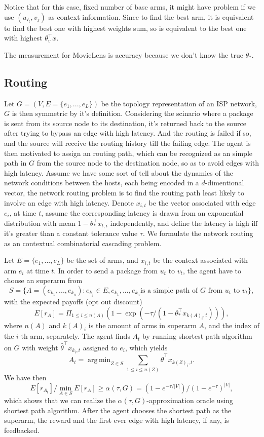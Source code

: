 \documentclass[a4paper,11pt]{article}
\DeclareMathOperator*{\argmin}{arg\,min}
\begin{document}
Notice that for this case, fixed number of base arms, it might have problem if we use $(u_{I_t}, v_j)$ as context information.
Since to find the best arm, it is equivalent to find the best one with highest weights sum, so is equivalent to the best one with highest $\theta_{v}^{\top}x$.

The measurement for MovieLens is accuracy because we don't know the true $\theta_{\ast}$.

\subsection{Routing}

Let $G=(V,E=\{e_1,...,e_L\})$ be the topology representation of an ISP network, $G$ is then symmetric by it's definition. 
Considering the scinario where a package is sent from its source node to its destination, it's returned back to the source after trying to bypass an edge with high latency.
And the routing is failed if so, and the source will receive the routing history till the failing edge.
The agent is then motivated to assign an routing path, which can be recognized as an simple path in $G$ from the source node to the destination node, so as to avoid edges with high latency. 
Assume we have some sort of tell about the dynamics of the network conditions between the hosts, each being encoded in a $d$-dimentional vector, the network routing problem is to find the routing path least likely to involve an edge with high latency.
Denote $x_{i,t}$ be the vector associated with edge $e_i$, at time $t$, assume the corresponding latency is drawn from an exponential distribution with mean $1 - \theta_{\ast}^{\top}x_{t,i}$ independently,
and define the latency is high iff it's greater than a constant tolerance value $\tau$.
We formulate the network routing as an contextual combinatorial cascading problem.

Let $E=\{e_1,...,e_L\}$ be the set of arms, and $x_{i,t}$ be the context associated with arm $e_i$ at time $t$.
In order to send a package from $u_t$ to $v_t$,
the agent have to choose an superarm from $$S=\{A=(e_{k_1},...,e_{k_n}):e_{k_j}\in E, e_{k_1},...,e_{k_n} \text{is a simple path of } G \text{ from } u_t \text{ to } v_t\},$$
with the expected payoffs (opt out discount) $$E[r_A]=\Pi_{1\leq i\leq n(A)}(1-\exp(-\tau/(1-\theta_{\ast}^{\top}x_{k(A)_i,t}))),$$
where $n(A)$ and $k(A)_i$ is the amount of arms in superarm $A$, and the index of the $i$-th arm, separately.
The agent finds $A_t$ by running shortest path algorithm on $G$ with weight $\hat{\theta}^{\top}x_{k_i,t}$ assigned to $e_i$, which yields $$A_t=\argmin_{Z\in S}\sum_{1\leq i\leq n(Z)}\hat{\theta}^{\top}x_{k(Z)_i,t}.$$
We have then $$E[r_{A_t}]/\min_{A\in S}E[r_A]\geq \alpha(\tau, G) = (1-e^{-\tau/|V|})/(1-e^{-\tau})^{|V|},$$
which shows that we can realize the $\alpha(\tau, G)$-approximation oracle using shortest path algorithm.
After the agent chooses the shortest path as the superarm, the reward and the first ever edge with high latency, if any, is feedbacked.
\end{document}
